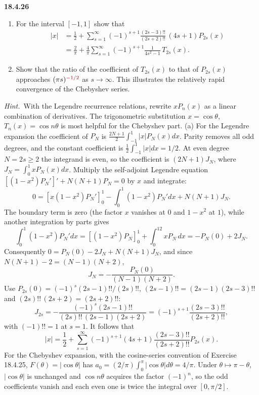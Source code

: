 \par\bigskip
\noindent\textbf{18.4.26}
\begin{enumerate}
\item[(a)] For the interval $[-1,1]$ show that
\begin{align*}
|x|&=\frac{1}{2}+\sum_{s=1}^{\infty}(-1)^{s+1}
\frac{(2s-3)!!}{(2s+2)!!}\,(4s+1)P_{2s}(x)\\
&=\frac{2}{\pi}+\frac{4}{\pi}\sum_{s=1}^{\infty}
(-1)^{s+1}\frac{1}{4s^{2}-1}\,T_{2s}(x).
\end{align*}
\item[(b)] Show that the ratio of the coefficient of $T_{2s}(x)$ to
that of $P_{2s}(x)$ approaches $(\pi s)^{\erratum{-1/2}}$ as
$s\to\infty$. This illustrates the relatively rapid convergence of
the Chebyshev series.
\end{enumerate}
\par\emph{Hint.}~With the Legendre recurrence relations, rewrite
$xP_{n}(x)$ as a linear combination of derivatives. The
trigonometric substitution $x=\cos\theta$, $T_{n}(x)=\cos n\theta$
is most helpful for the Chebyshev part.
\solution
(a) For the Legendre expansion the coefficient of $P_N$ is
$\frac{2N+1}2\int_{-1}^1|x|P_N(x)dx$.  Parity removes all odd degrees,
and the constant coefficient is
$\tfrac12\int_{-1}^1|x|dx=1/2$.  At even degree $N=2s\ge2$ the
integrand is even, so the coefficient is $(2N+1)J_N$, where
$J_N=\int_0^1xP_N(x)dx$.
Multiply the self-adjoint Legendre equation
$[(1-x^2)P_N']'+N(N+1)P_N=0$ by $x$ and integrate:
\[
0=[x(1-x^2)P_N']_0^1
  -\int_0^1(1-x^2)P_N'dx+N(N+1)J_N.
\]
The boundary term is zero (the factor $x$ vanishes at $0$ and
$1-x^2$ at $1$), while another integration by parts gives
\[
\int_0^1(1-x^2)P_N'dx
 =[(1-x^2)P_N]_0^1+\int_0^12xP_N\,dx=-P_N(0)+2J_N.
\]
Consequently $0=P_N(0)-2J_N+N(N+1)J_N$, and since
$N(N+1)-2=(N-1)(N+2)$,
\[
J_N=-\frac{P_N(0)}{(N-1)(N+2)}.
\]
Use $P_{2s}(0)=(-1)^s(2s-1)!!/(2s)!!$, $(2s-1)!!=(2s-1)(2s-3)!!$
and $(2s)!!\,(2s+2)=(2s+2)!!$:
\[
J_{2s}=-\frac{(-1)^s(2s-1)!!}{(2s)!!\,(2s-1)(2s+2)}
 =(-1)^{s+1}\frac{(2s-3)!!}{(2s+2)!!},
\]
with $(-1)!!=1$ at $s=1$.
It follows that
\[
\boxed{|x|=\frac12+\sum_{s=1}^\infty
 (-1)^{s+1}(4s+1)\frac{(2s-3)!!}{(2s+2)!!}P_{2s}(x)}.
\]
For the Chebyshev expansion, with the cosine-series convention of
Exercise 18.4.25, $F(\theta)=|\cos\theta|$ has
$a_0=(2/\pi)\int_0^\pi|\cos\theta|d\theta=4/\pi$.  Under
$\theta\mapsto\pi-\theta$, $|\cos\theta|$ is unchanged and
$\cos n\theta$ acquires the factor $(-1)^n$, so the odd coefficients
vanish and each even one is twice the integral over $[0,\pi/2]$.
